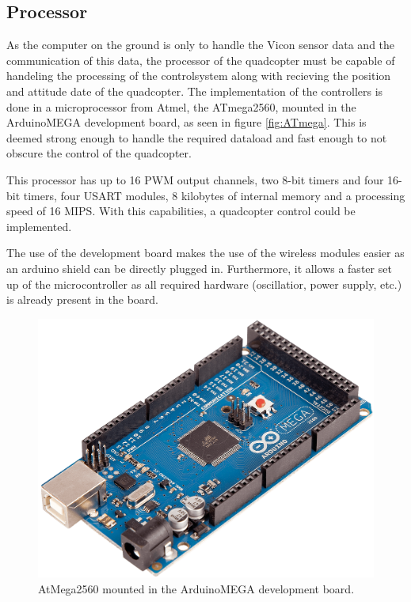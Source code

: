 \subsection{Processor}
As the computer on the ground is only to handle the Vicon sensor data and the communication of this data, the processor of the quadcopter must be capable of handeling the processing of the controlsystem along with recieving the position and attitude date of the quadcopter.
The implementation of the controllers is done in a microprocessor from Atmel, the ATmega2560, mounted in the ArduinoMEGA development board, as seen in figure \autoref{fig:ATmega}. This is deemed strong enough to handle the required dataload and fast enough to not obscure the control of the quadcopter. 

This processor has up to 16 PWM output channels, two 8-bit timers and four 16-bit timers, four USART modules, 8 kilobytes of internal memory and a processing speed of 16 MIPS. With this capabilities, a quadcopter control could be implemented.

The use of the development board makes the use of the wireless modules easier as an arduino shield can be directly plugged in. Furthermore, it allows a faster set up of the microcontroller as all required hardware (oscillatior, power supply, etc.) is already present in the board. 
\begin{figure}[H]
	\centering
	\includegraphics[scale=0.17]{figures/ARDUINO_MEGA}
	\caption{AtMega2560 mounted in the ArduinoMEGA development board.}
	\label{fig:ATmega}
\end{figure}
